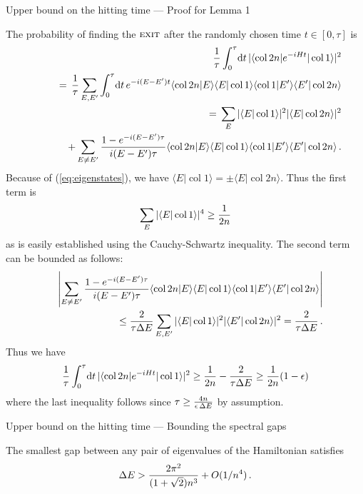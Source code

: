 \documentclass{beamer}
\newcommand{\<}{\langle}
\renewcommand{\>}{\rangle}
\newcommand{\be}{\begin{equation}}
\newcommand{\ee}{\end{equation}}
\newcommand{\bea}{\begin{eqnarray}}
\newcommand{\eea}{\end{eqnarray}}
\newcommand{\exit}{{\textsc{exit}}}
\renewcommand{\d}{{\mathrm{d}}}
\newcommand{\col}{\mathop{\mathrm{col}}\nolimits}
\begin{document}
\begin{frame}[allowframebreaks]{Upper bound on the hitting time --- Proof for Lemma 1}

\small

The probability of finding the $\exit$ after the randomly chosen time $t
\in [0,\tau]$ is
\bea
  && {1 \over \tau} \int_0^\tau \! \d t \,
     |\<\col 2n|e^{-i H t}|\col 1\>|^2 \nonumber\\
  &&\qquad = \, {1 \over \tau} \sum_{E,E'} \int_0^\tau \! \d t \, 
                e^{-i(E-E')t} \<\col 2n|E\>\<E|\col 1\> 
                              \<\col 1|E'\>\<E'|\col 2n\> \\
  &&\qquad = \, \sum_E |\<E|\col 1\>|^2 |\<E|\col 2n\>|^2 \nonumber\\
  &&\qquad ~ \,\, + \sum_{E \ne E'} {1 - e^{-i(E-E')\tau} \over i(E-E')\tau}
	      \<\col 2n|E\>\<E|\col 1\> \<\col 1|E'\>\<E'|\col 2n\>
\,.
\eea
Because of (\ref{eq:eigenstates}), we have $\<E|\col 1\>=\pm\<E|\col
2n\>$.  Thus the first term is
\be
  \sum_E |\<E|\col 1\>|^4 \ge {1 \over 2n}
\ee
as is easily established using the Cauchy-Schwartz inequality.  The second
term can be bounded as follows:
\bea
  && \left |\sum_{E \ne E'} {1 - e^{-i(E-E')\tau} \over i(E-E')\tau}
           \<\col 2n|E\>\<E|\col 1\> 
           \<\col 1|E'\>\<E'|\col 2n\> \right| \nonumber\\
  && \qquad \le {2 \over \tau \Delta E} 
     \sum_{E,E'} |\<E|\col 1\>|^2 |\<E'|\col 2n\>|^2
    ={2 \over \tau \Delta E}
\,.
\eea
Thus we have
\be
  {1 \over \tau} \int_0^\tau \! \d t \, |\<\col 2n|e^{-i H t}|\col 1\>|^2
  \ge {1 \over 2n} - {2 \over \tau \Delta E}
  \ge {1 \over 2n} (1-\epsilon)
\ee
where the last inequality follows since $\tau \ge {4 n \over \epsilon \,
\Delta E}$ by assumption.

\normalsize

\end{frame}


\begin{frame}[allowframebreaks]{Upper bound on the hitting time --- Bounding the spectral gaps}

\begin{lemma}\label{lemma:gap}
The smallest gap between any pair of eigenvalues of the Hamiltonian
satisfies
\be
  \Delta E > {2 \pi^2 \over (1+\sqrt2)n^3} + O(1/n^4)
\,.
\ee
\end{lemma}

\end{frame}
\end{document}
